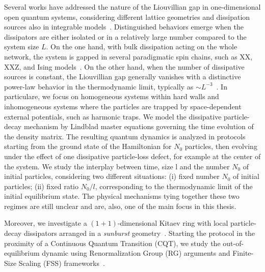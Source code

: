 Several works have addressed the nature of the Liouvillian gap in one-dimensional open quantum systems, considering different lattice geometries and dissipation sources also in integrable models~\cite{Z-2015-relaxtimes}. Distinguished behaviors emerge when the dissipators are either isolated or in a relatively large number compared to the system size $L$.
On the one hand, with bulk dissipation acting on the whole network, the system is gapped in several paradigmatic spin chains, such as XX, XXZ, and Ising models~\cite{YWHWD-2021-artificialnetweork, Z-2015-relaxtimes, KS-2019-nonhermitiankitaevladder}. On the other hand, when the number of dissipative sources is constant, the Liouvillian gap generally vanishes with a distinctive power-law behavior in the thermodynamic limit, typically as $\sim L^{-3}$~\cite{KS-2020-boundarydephasing, TV-2021-dissipativeboundaries, Z-2011-XXXchaingap}. In particulare, we focus on homogeneous systems within hard walls and inhomogeneous systems where the particles are trapped
by space-dependent external potentials, such as harmonic traps. We model the dissipative particle-
decay mechanism by Lindblad master equations governing the time evolution of the density matrix.
The resulting quantum dynamics is analyzed in protocols starting from the ground state of the
Hamiltonian for $N_0$ particles, then evolving under the effect of one dissipative particle-loss defect,
for example at the center of the system. We study the interplay between time, size l and the number
$N_0$ of initial particles, considering two different situations: (i) fixed number $N_0$ of initial particles;
(ii) fixed ratio $N_0 /l$, corresponding to the thermodynamic limit of the initial equilibrium state.
The physical mechanisms tying together these two regimes are still unclear and are, also, one of the main focus in this thesis.%


Moreover, we investigate a $(1+1)$-dimensional Kitaev ring with local particle-decay dissipators arranged in a \textit{sunburst} geometry~\cite{FRV-staticsunburst, FRV-timesunburst, MS-2022-sunburstquench}.
Starting the protocol in the proximity of a Continuous Quantum Transition (CQT), we study the out-of-equilibrium dynamic using Renormalization Group (RG) arguments and Finite-Size Scaling (FSS) frameworks~\cite{C-1996-ScalingandRG, RV-2021-coherentanddissipativedynamicsreview}.

